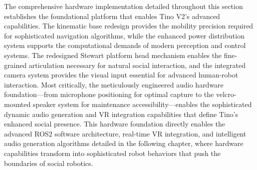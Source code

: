 The comprehensive hardware implementation detailed throughout this section establishes the foundational platform that enables Tino V2's advanced capabilities. The kinematic base redesign provides the mobility precision required for sophisticated navigation algorithms, while the enhanced power distribution system supports the computational demands of modern perception and control systems. The redesigned Stewart platform head mechanism enables the fine-grained articulation necessary for natural social interaction, and the integrated camera system provides the visual input essential for advanced human-robot interaction. Most critically, the meticulously engineered audio hardware foundation—from microphone positioning for optimal capture to the velcro-mounted speaker system for maintenance accessibility—enables the sophisticated dynamic audio generation and VR integration capabilities that define Tino's enhanced social presence. This hardware foundation directly enables the advanced ROS2 software architecture, real-time VR integration, and intelligent audio generation algorithms detailed in the following chapter, where hardware capabilities transform into sophisticated robot behaviors that push the boundaries of social robotics.

